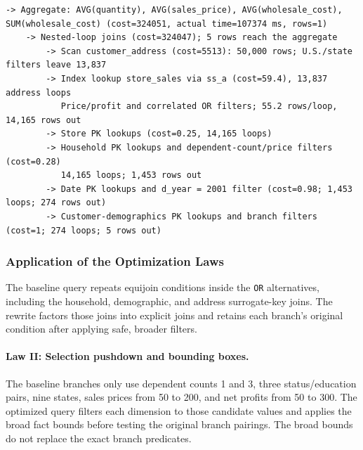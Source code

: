 \documentclass{ULBreport}
\begin{document}
\begin{lstlisting}[caption={Condensed baseline \texttt{EXPLAIN ANALYZE} plan on SF1 for Query 13}, label={lst:q13_explain_base_sf1}, basicstyle=\ttfamily\scriptsize, breaklines=true, frame=single]
-> Aggregate: AVG(quantity), AVG(sales_price), AVG(wholesale_cost), SUM(wholesale_cost) (cost=324051, actual time=107374 ms, rows=1)
    -> Nested-loop joins (cost=324047); 5 rows reach the aggregate
        -> Scan customer_address (cost=5513): 50,000 rows; U.S./state filters leave 13,837
        -> Index lookup store_sales via ss_a (cost=59.4), 13,837 address loops
           Price/profit and correlated OR filters; 55.2 rows/loop, 14,165 rows out
        -> Store PK lookups (cost=0.25, 14,165 loops)
        -> Household PK lookups and dependent-count/price filters (cost=0.28)
           14,165 loops; 1,453 rows out
        -> Date PK lookups and d_year = 2001 filter (cost=0.98; 1,453 loops; 274 rows out)
        -> Customer-demographics PK lookups and branch filters (cost=1; 274 loops; 5 rows out)
\end{lstlisting}

\subsubsection{Application of the Optimization Laws}
The baseline query repeats equijoin conditions inside the \texttt{OR} alternatives, including the household, demographic, and address surrogate-key joins. The rewrite factors those joins into explicit joins and retains each branch's original condition after applying safe, broader filters.

\paragraph{Law II: Selection pushdown and bounding boxes.}
The baseline branches only use dependent counts 1 and 3, three status/education pairs, nine states, sales prices from 50 to 200, and net profits from 50 to 300. The optimized query filters each dimension to those candidate values and applies the broad fact bounds before testing the original branch pairings. The broad bounds do not replace the exact branch predicates.
\end{document}
